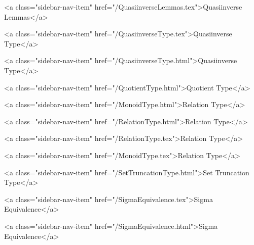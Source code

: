       
    
      
        
          <a class="sidebar-nav-item" href="/QuasiinverseLemmas.tex">Quasiinverse Lemmas</a>
        
      
    
      
        
          <a class="sidebar-nav-item" href="/QuasiinverseType.tex">Quasiinverse Type</a>
        
      
    
      
        
          <a class="sidebar-nav-item" href="/QuasiinverseType.html">Quasiinverse Type</a>
        
      
    
      
        
          <a class="sidebar-nav-item" href="/QuotientType.html">Quotient Type</a>
        
      
    
      
        
          <a class="sidebar-nav-item" href="/MonoidType.html">Relation Type</a>
        
      
    
      
        
          <a class="sidebar-nav-item" href="/RelationType.html">Relation Type</a>
        
      
    
      
        
          <a class="sidebar-nav-item" href="/RelationType.tex">Relation Type</a>
        
      
    
      
        
          <a class="sidebar-nav-item" href="/MonoidType.tex">Relation Type</a>
        
      
    
      
        
          <a class="sidebar-nav-item" href="/SetTruncationType.html">Set Truncation Type</a>
        
      
    
      
        
          <a class="sidebar-nav-item" href="/SigmaEquivalence.tex">Sigma Equivalence</a>
        
      
    
      
        
          <a class="sidebar-nav-item" href="/SigmaEquivalence.html">Sigma Equivalence</a>
        
